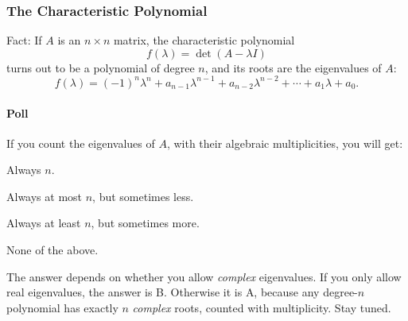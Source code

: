 
\begin{frame}
\frametitle{The Characteristic Polynomial}

\displayskips{3mm}
\alert{Fact:}
If $A$ is an $n\times n$ matrix, the characteristic polynomial
\[ f(\lambda) = \det(A-\lambda I) \]
turns out to be a polynomial of degree $n$, and its roots are the eigenvalues of
$A$:
\[ f(\lambda) 
= (-1)^n\lambda^n + a_{n-1}\lambda^{n-1} + a_{n-2}\lambda^{n-2} + \cdots +
a_1\lambda + a_0. \]

\begin{poll}
\framesubtitle{Poll}
\pause
\begin{bluebox}[Poll]{.7\linewidth}
  If you count the eigenvalues of $A$, with their algebraic multiplicities, you
  will get:
  \begin{eAlpherate}
  \item Always $n$.
  \item Always at most $n$, but sometimes less.
  \item Always at least $n$, but sometimes more.
  \item None of the above.
  \end{eAlpherate}
\end{bluebox}

\pause\smallskip
The answer depends on whether you allow \emph{complex} eigenvalues.
\pause
If you only allow real eigenvalues, the answer is \alert{B.}
\pause
Otherwise it is \alert{A,} because any degree-$n$ polynomial has exactly $n$
\emph{complex} roots, counted with multiplicity.
\pause
Stay tuned.
\end{poll}

\end{frame}



